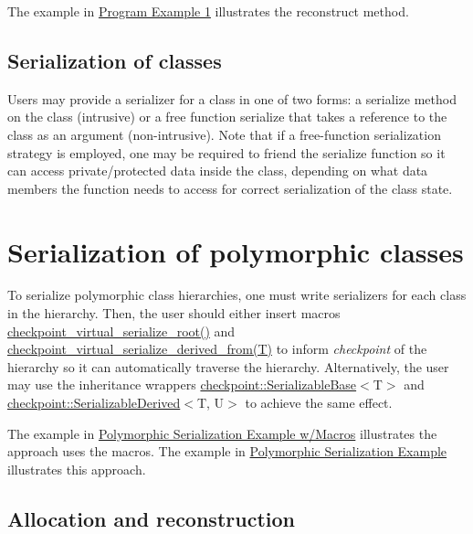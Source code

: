 The example in \hyperlink{ckpt_learn_ex1}{Program Example 1} illustrates the reconstruct method.\hypertarget{ckpt_learn_serialize_serialize_class}{}\subsection{Serialization of classes}\label{ckpt_learn_serialize_serialize_class}
Users may provide a serializer for a class in one of two forms\+: a {\ttfamily serialize} method on the class (intrusive) or a free function {\ttfamily serialize} that takes a reference to the class as an argument (non-\/intrusive). Note that if a free-\/function serialization strategy is employed, one may be required to friend the serialize function so it can access private/protected data inside the class, depending on what data members the function needs to access for correct serialization of the class state.\hypertarget{ckpt_learn_serialize_serialize_polymorphic}{}\section{Serialization of polymorphic classes}\label{ckpt_learn_serialize_serialize_polymorphic}
To serialize polymorphic class hierarchies, one must write serializers for each class in the hierarchy. Then, the user should either insert macros {\ttfamily \hyperlink{lib_2checkpoint_2src_2checkpoint_2dispatch_2vrt_2base_8h_aa6062a11e9781a28fe043f10338238df}{checkpoint\+\_\+virtual\+\_\+serialize\+\_\+root()}} and {\ttfamily \hyperlink{derived_8h_acc015406441054fae32d63af2b86ca0d}{checkpoint\+\_\+virtual\+\_\+serialize\+\_\+derived\+\_\+from(\+T)}} to inform {\itshape checkpoint} of the hierarchy so it can automatically traverse the hierarchy. Alternatively, the user may use the inheritance wrappers {\ttfamily \hyperlink{namespacecheckpoint_ae8adefa66d7575697f8e465bed48e3cc}{checkpoint\+::\+Serializable\+Base}$<$T$>$} and {\ttfamily \hyperlink{namespacecheckpoint_a9c4afb2c8d1bc1f58b9e158d64331d65}{checkpoint\+::\+Serializable\+Derived}$<$T, U$>$} to achieve the same effect.

The example in \hyperlink{ckpt_learn_example_polymorphic_macro}{Polymorphic Serialization Example w/\+Macros} illustrates the approach uses the macros. The example in \hyperlink{ckpt_learn_example_polymorphic}{Polymorphic Serialization Example} illustrates this approach.\hypertarget{ckpt_learn_serialize_serialize_polymorphic_step}{}\subsection{Allocation and reconstruction}\label{ckpt_learn_serialize_serialize_polymorphic_step}

